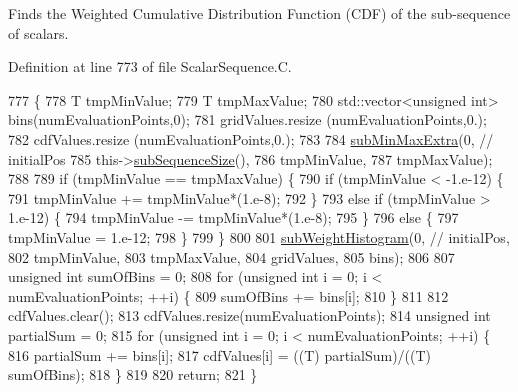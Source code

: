 Finds the Weighted Cumulative Distribution Function (C\-D\-F) of the sub-\/sequence of scalars. 



Definition at line 773 of file Scalar\-Sequence.\-C.


\begin{DoxyCode}
777 \{
778   T                         tmpMinValue;
779   T                         tmpMaxValue;
780   std::vector<unsigned int> bins(numEvaluationPoints,0);
781   gridValues.resize             (numEvaluationPoints,0.);
782   cdfValues.resize              (numEvaluationPoints,0.);
783 
784   \hyperlink{class_q_u_e_s_o_1_1_scalar_sequence_aee81b99614cc5836be198c0cf20879a5}{subMinMaxExtra}(0, \textcolor{comment}{// initialPos}
785                  this->\hyperlink{class_q_u_e_s_o_1_1_scalar_sequence_a0288ea295eedc216a1617b3286f6f3a0}{subSequenceSize}(),
786                  tmpMinValue,
787                  tmpMaxValue);
788 
789   \textcolor{keywordflow}{if} (tmpMinValue == tmpMaxValue) \{
790     \textcolor{keywordflow}{if} (tmpMinValue < -1.e-12) \{
791       tmpMinValue += tmpMinValue*(1.e-8);
792     \}
793     \textcolor{keywordflow}{else} \textcolor{keywordflow}{if} (tmpMinValue > 1.e-12) \{
794       tmpMinValue -= tmpMinValue*(1.e-8);
795     \}
796     \textcolor{keywordflow}{else} \{
797       tmpMinValue = 1.e-12;
798     \}
799   \}
800 
801   \hyperlink{class_q_u_e_s_o_1_1_scalar_sequence_a23e38a89b7dba988b244f05a8b454cd8}{subWeightHistogram}(0, \textcolor{comment}{// initialPos,}
802                      tmpMinValue,
803                      tmpMaxValue,
804                      gridValues,
805                      bins);
806 
807   \textcolor{keywordtype}{unsigned} \textcolor{keywordtype}{int} sumOfBins = 0;
808   \textcolor{keywordflow}{for} (\textcolor{keywordtype}{unsigned} \textcolor{keywordtype}{int} i = 0; i < numEvaluationPoints; ++i) \{
809     sumOfBins += bins[i];
810   \}
811 
812   cdfValues.clear();
813   cdfValues.resize(numEvaluationPoints);
814   \textcolor{keywordtype}{unsigned} \textcolor{keywordtype}{int} partialSum = 0;
815   \textcolor{keywordflow}{for} (\textcolor{keywordtype}{unsigned} \textcolor{keywordtype}{int} i = 0; i < numEvaluationPoints; ++i) \{
816     partialSum += bins[i];
817     cdfValues[i] = ((T) partialSum)/((T) sumOfBins);
818   \}
819 
820   \textcolor{keywordflow}{return};
821 \}
\end{DoxyCode}
